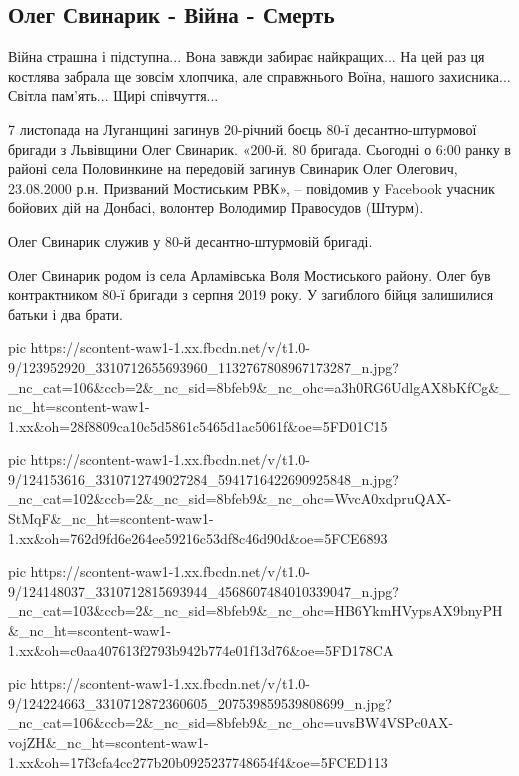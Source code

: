  
 
 

\subsection{Олег Свинарик - Війна - Смерть}

Війна страшна і підступна... Вона завжди забирає найкращих... На цей раз ця
костлява забрала  ще зовсім хлопчика, але справжнього Воїна, нашого
захисника... Світла пам'ять... Щирі співчуття...

7 листопада на Луганщині загинув 20-річний боєць 80-ї десантно-штурмової
бригади з Львівщини Олег Свинарик.  «200-й. 80 бригада. Сьогодні о 6:00 ранку
в районі села Половинкине на передовій загинув Свинарик Олег Олегович,
23.08.2000 р.н. Призваний Мостиським РВК», – повідомив у Facebook учасник
бойових дій на Донбасі, волонтер Володимир Правосудов (Штурм).

Олег Свинарик служив у 80-й десантно-штурмовій бригаді.

Олег Свинарик родом із села Арламівська Воля Мостиського району.  Олег  був
контрактником 80-ї бригади з серпня 2019 року. У загиблого бійця залишилися
батьки і два брати.

\ifcmt
pic https://scontent-waw1-1.xx.fbcdn.net/v/t1.0-9/123952920_3310712655693960_1132767808967173287_n.jpg?_nc_cat=106&ccb=2&_nc_sid=8bfeb9&_nc_ohc=a3h0RG6UdlgAX8bKfCg&_nc_ht=scontent-waw1-1.xx&oh=28f8809ca10c5d5861c5465d1ac5061f&oe=5FD01C15

pic https://scontent-waw1-1.xx.fbcdn.net/v/t1.0-9/124153616_3310712749027284_5941716422690925848_n.jpg?_nc_cat=102&ccb=2&_nc_sid=8bfeb9&_nc_ohc=WvcA0xdpruQAX-StMqF&_nc_ht=scontent-waw1-1.xx&oh=762d9fd6e264ee59216c53df8c46d90d&oe=5FCE6893

pic https://scontent-waw1-1.xx.fbcdn.net/v/t1.0-9/124148037_3310712815693944_4568607484010339047_n.jpg?_nc_cat=103&ccb=2&_nc_sid=8bfeb9&_nc_ohc=HB6YkmHVypsAX9bnyPH&_nc_ht=scontent-waw1-1.xx&oh=c0aa407613f2793b942b774e01f13d76&oe=5FD178CA

pic https://scontent-waw1-1.xx.fbcdn.net/v/t1.0-9/124224663_3310712872360605_207539859539808699_n.jpg?_nc_cat=106&ccb=2&_nc_sid=8bfeb9&_nc_ohc=uvsBW4VSPc0AX-vojZH&_nc_ht=scontent-waw1-1.xx&oh=17f3cfa4cc277b20b0925237748654f4&oe=5FCED113
\fi
